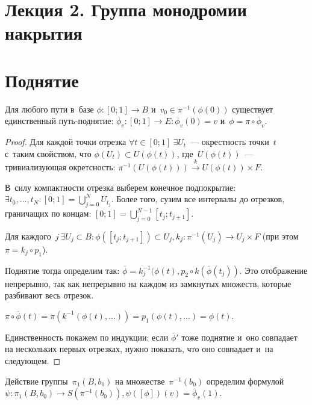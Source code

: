 \documentclass{article}
\begin{document}
\section*{Лекция 2. Группа монодромии накрытия}

\resetcntrs

\section{Поднятие}

\begin{lemma}[О~поднятии]
	Для любого пути в~базе $\phi: [0; 1] \rightarrow B$ и~$v_0 \in
	\pi^{-1}(\phi(0))$ существует единственный путь-поднятие:
	$\overline{\phi}_v: [0; 1] \rightarrow E: \overline{\phi}_v(0) = v$
	и~$\phi = \pi \circ \overline{\phi}_v$.
\end{lemma}

\begin{proof}
	Для каждой точки отрезка $\forall t \in [0; 1]\ \exists U_t$~--- окрестность
	точки~$t$ с~таким свойством, что $\phi(U_t) \subset U(\phi(t))$,
	где~$U(\phi(t))$~--- тривиализующая окретсность: $\pi^{-1}(U(\phi(t)))
	\overset{k}\rightarrow U(\phi(t)) \times F$.

	В~силу компактности отрезка выберем конечное подпокрытие: $\exists t_0,
	\ldots, t_N: [0; 1] = \bigcup\limits_{j=0}^{N} U_{t_j}$. Более того, сузим все
	интервалы до отрезков, граничащих по концам: $[0; 1] =
	\bigcup\limits_{j=0}^{N-1} [t_j; t_{j+1}]$.

	Для каждого~$j\ \exists U_j \subset B: \phi([t_j; t_{j+1}]) \subset U_j, k_j:
	\pi^{-1}(U_j) \rightarrow U_j \times F$ (при этом $\pi = k_j \circ p_1$).

	Поднятие тогда определим так: $\overline{\phi} = k_j^{-1}(\phi(t), p_2 \circ
	k(\overline\phi(t_j))$. Это отображение непрерывно, так как непрерывно на
	каждом из замкнутых множеств, которые разбивают весь отрезок.

	$\pi \circ \overline\phi(t) = \pi(k^{-1}(\phi(t), \ldots)) = p_1(\phi(t),
	\ldots) = \phi(t)$.

	Единственность покажем по индукции: если $\overline\phi'$ тоже поднятие и~оно
	совпадает на нескольких первых отрезках, нужно показать, что оно совпадает
	и~на следующем.
\end{proof}
\begin{definition}
	Действие группы~$\pi_1(B, b_0)$ на множестве~$\pi^{-1}(b_0)$ определим
	формулой $\psi: \pi_1(B, b_0) \rightarrow S(\pi^{-1}(b_0)), \psi([\phi])(v) =
	\overline\phi_v(1)$.
\end{definition}
\end{document}
